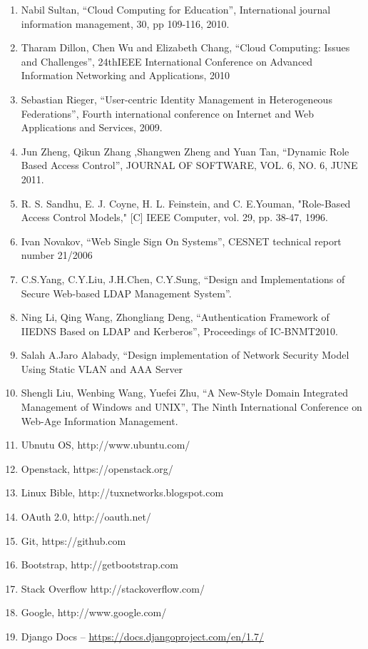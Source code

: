 \documentclass[12pt]{report}
\begin{document}
\begin{enumerate}
\item Nabil Sultan, ``Cloud Computing for Education”, International journal information management, 30, pp 109-116, 2010.
\item Tharam Dillon, Chen Wu and Elizabeth Chang, ``Cloud Computing: Issues and Challenges'',  24thIEEE International Conference on Advanced Information Networking and Applications, 2010 
\item Sebastian Rieger, ``User-centric Identity Management in Heterogeneous Federations'', Fourth international conference on Internet and Web Applications and Services, 2009.
\item Jun Zheng, Qikun Zhang ,Shangwen Zheng and Yuan Tan, ``Dynamic Role Based Access Control'',  JOURNAL OF SOFTWARE, VOL. 6, NO. 6, JUNE 2011.
\item R. S. Sandhu, E. J. Coyne, H. L. Feinstein, and C. E.Youman, "Role-Based Access Control Models," [C] IEEE Computer, vol. 29, pp. 38-47, 1996.
\item Ivan Novakov, ``Web Single Sign On Systems'', CESNET technical report number 21/2006
\item C.S.Yang, C.Y.Liu, J.H.Chen, C.Y.Sung, ``Design and Implementations of Secure Web-based LDAP Management System''.
\item Ning Li, Qing Wang, Zhongliang Deng, ``Authentication Framework of IIEDNS Based on LDAP and Kerberos'', Proceedings of IC-BNMT2010.
\item Salah A.Jaro Alabady, ``Design implementation of Network Security Model Using Static VLAN and AAA Server
\item Shengli Liu, Wenbing Wang, Yuefei Zhu, ``A New-Style Domain Integrated Management of Windows and UNIX'', The Ninth International Conference on Web-Age Information Management.
\item Ubnutu OS, http://www.ubuntu.com/
\item Openstack, https://openstack.org/
\item Linux Bible, http://tuxnetworks.blogspot.com
\item OAuth 2.0, http://oauth.net/
\item Git, https://github.com
\item Bootstrap, http://getbootstrap.com 
\item Stack Overflow http://stackoverflow.com/
\item Google, http://www.google.com/
	\item Django Docs -- \url{https://docs.djangoproject.com/en/1.7/}

\end{enumerate}
\end{document}
